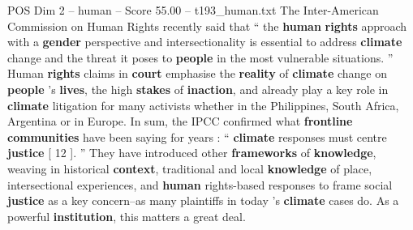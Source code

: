\begin{textsample}{POS Dim 2 – human – Score 55.00 – t193\_human.txt}
The Inter-American Commission on Human Rights recently said that “ the \textbf{human} \textbf{rights} approach with a \textbf{gender} perspective and intersectionality is essential to address \textbf{climate} change and the threat it poses to \textbf{people} in the most vulnerable situations. ” Human \textbf{rights} claims in \textbf{court} emphasise the \textbf{reality} of \textbf{climate} change on \textbf{people} ’s \textbf{lives}, the high \textbf{stakes} of \textbf{inaction}, and already play a key role in \textbf{climate} litigation for many activists whether in the Philippines, South Africa, Argentina or in Europe.
In sum, the IPCC confirmed what \textbf{frontline} \textbf{communities} have been saying for years : “ \textbf{climate} responses must centre \textbf{justice} [ 12 ]. ” They have introduced other \textbf{frameworks} of \textbf{knowledge}, weaving in historical \textbf{context}, traditional and local \textbf{knowledge} of place, intersectional experiences, and \textbf{human} rights-based responses to frame social \textbf{justice} as a key concern–as many plaintiffs in today ’s \textbf{climate} cases do.
As a powerful \textbf{institution}, this matters a great deal.

\end{textsample}
